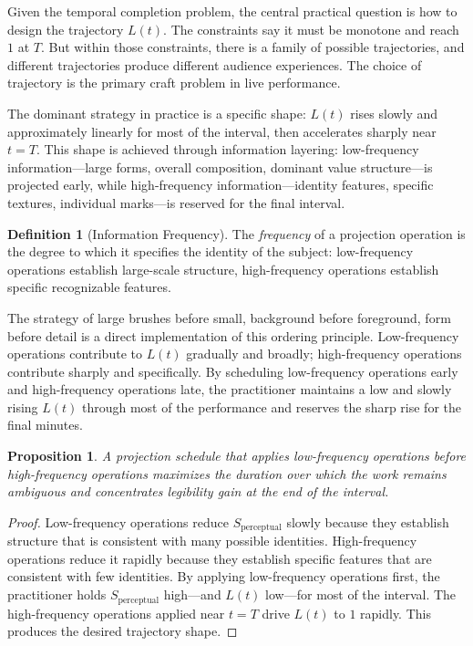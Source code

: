\documentclass[11pt, twoside]{article}
\theoremstyle{plain}
\newtheorem{proposition}[theorem]{Proposition}
\theoremstyle{definition}
\newtheorem{definition}[theorem]{Definition}
\theoremstyle{remark}
\begin{document}
Given the temporal completion problem, the central practical question is how to design the trajectory $L(t)$. The constraints say it must be monotone and reach $1$ at $T$. But within those constraints, there is a family of possible trajectories, and different trajectories produce different audience experiences. The choice of trajectory is the primary craft problem in live performance.

The dominant strategy in practice is a specific shape: $L(t)$ rises slowly and approximately linearly for most of the interval, then accelerates sharply near $t = T$. This shape is achieved through information layering: low-frequency information---large forms, overall composition, dominant value structure---is projected early, while high-frequency information---identity features, specific textures, individual marks---is reserved for the final interval.

\begin{definition}[Information Frequency]
The \emph{frequency} of a projection operation is the degree to which it specifies the identity of the subject: low-frequency operations establish large-scale structure, high-frequency operations establish specific recognizable features.
\end{definition}

The strategy of large brushes before small, background before foreground, form before detail is a direct implementation of this ordering principle. Low-frequency operations contribute to $L(t)$ gradually and broadly; high-frequency operations contribute sharply and specifically. By scheduling low-frequency operations early and high-frequency operations late, the practitioner maintains a low and slowly rising $L(t)$ through most of the performance and reserves the sharp rise for the final minutes.

\begin{proposition}
\label{prop:frequency-ordering}
A projection schedule that applies low-frequency operations before high-frequency operations maximizes the duration over which the work remains ambiguous and concentrates legibility gain at the end of the interval.
\end{proposition}

\begin{proof}
Low-frequency operations reduce $S_{\text{perceptual}}$ slowly because they establish structure that is consistent with many possible identities. High-frequency operations reduce it rapidly because they establish specific features that are consistent with few identities. By applying low-frequency operations first, the practitioner holds $S_{\text{perceptual}}$ high---and $L(t)$ low---for most of the interval. The high-frequency operations applied near $t = T$ drive $L(t)$ to $1$ rapidly. This produces the desired trajectory shape.
\end{proof}
\end{document}
